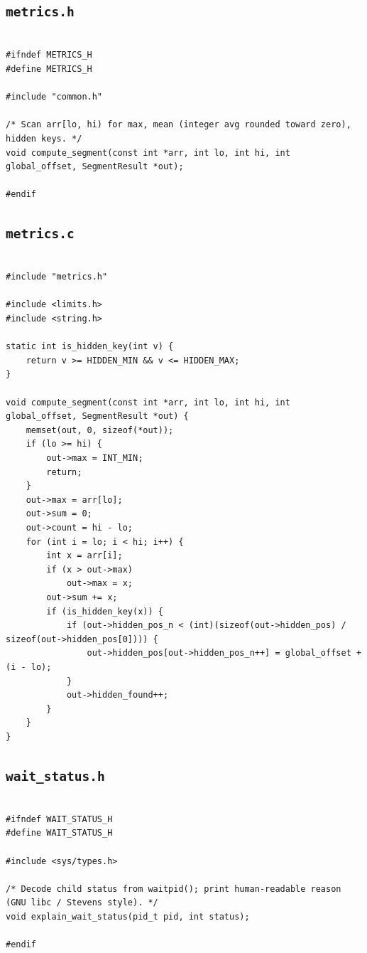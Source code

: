 \documentclass[11pt,a4paper]{article}
\begin{document}
\subsection{\texttt{metrics.h}}

\lstset{style=textbookc}\begin{lstlisting}[caption={File \texttt{metrics.h}},label=lst:metrics_h]

#ifndef METRICS_H
#define METRICS_H

#include "common.h"

/* Scan arr[lo, hi) for max, mean (integer avg rounded toward zero), hidden keys. */
void compute_segment(const int *arr, int lo, int hi, int global_offset, SegmentResult *out);

#endif

\end{lstlisting}\clearpage

\subsection{\texttt{metrics.c}}

\lstset{style=textbookc}\begin{lstlisting}[caption={File \texttt{metrics.c}},label=lst:metrics_c]

#include "metrics.h"

#include <limits.h>
#include <string.h>

static int is_hidden_key(int v) {
	return v >= HIDDEN_MIN && v <= HIDDEN_MAX;
}

void compute_segment(const int *arr, int lo, int hi, int global_offset, SegmentResult *out) {
	memset(out, 0, sizeof(*out));
	if (lo >= hi) {
		out->max = INT_MIN;
		return;
	}
	out->max = arr[lo];
	out->sum = 0;
	out->count = hi - lo;
	for (int i = lo; i < hi; i++) {
		int x = arr[i];
		if (x > out->max)
			out->max = x;
		out->sum += x;
		if (is_hidden_key(x)) {
			if (out->hidden_pos_n < (int)(sizeof(out->hidden_pos) / sizeof(out->hidden_pos[0]))) {
				out->hidden_pos[out->hidden_pos_n++] = global_offset + (i - lo);
			}
			out->hidden_found++;
		}
	}
}

\end{lstlisting}\clearpage

\subsection{\texttt{wait_status.h}}

\lstset{style=textbookc}\begin{lstlisting}[caption={File \texttt{wait\_status.h}},label=lst:wait_status_h]

#ifndef WAIT_STATUS_H
#define WAIT_STATUS_H

#include <sys/types.h>

/* Decode child status from waitpid(); print human-readable reason (GNU libc / Stevens style). */
void explain_wait_status(pid_t pid, int status);

#endif

\end{lstlisting}\clearpage
\end{document}
